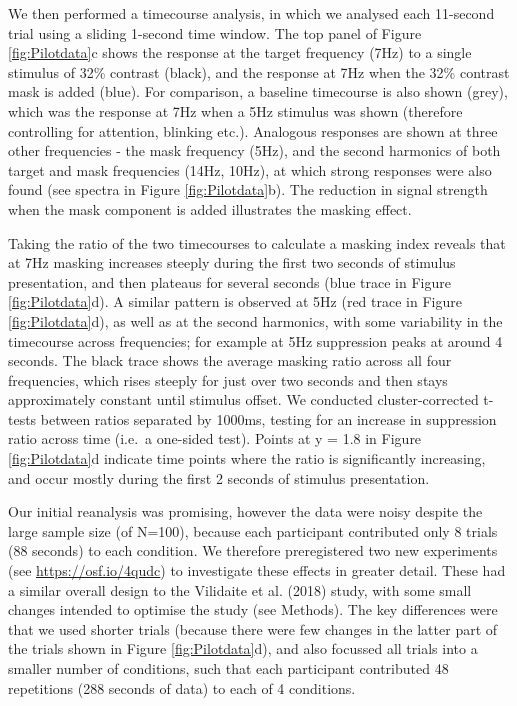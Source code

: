 \documentclass[
]{article}
\begin{document}
We then performed a timecourse analysis, in which we analysed each 11-second trial using a sliding 1-second time window. The top panel of Figure \ref{fig:Pilotdata}c shows the response at the target frequency (7Hz) to a single stimulus of 32\% contrast (black), and the response at 7Hz when the 32\% contrast mask is added (blue). For comparison, a baseline timecourse is also shown (grey), which was the response at 7Hz when a 5Hz stimulus was shown (therefore controlling for attention, blinking etc.). Analogous responses are shown at three other frequencies - the mask frequency (5Hz), and the second harmonics of both target and mask frequencies (14Hz, 10Hz), at which strong responses were also found (see spectra in Figure \ref{fig:Pilotdata}b). The reduction in signal strength when the mask component is added illustrates the masking effect.

Taking the ratio of the two timecourses to calculate a masking index reveals that at 7Hz masking increases steeply during the first two seconds of stimulus presentation, and then plateaus for several seconds (blue trace in Figure \ref{fig:Pilotdata}d). A similar pattern is observed at 5Hz (red trace in Figure \ref{fig:Pilotdata}d), as well as at the second harmonics, with some variability in the timecourse across frequencies; for example at 5Hz suppression peaks at around 4 seconds. The black trace shows the average masking ratio across all four frequencies, which rises steeply for just over two seconds and then stays approximately constant until stimulus offset. We conducted cluster-corrected t-tests between ratios separated by 1000ms, testing for an increase in suppression ratio across time (i.e.~a one-sided test). Points at y = 1.8 in Figure \ref{fig:Pilotdata}d indicate time points where the ratio is significantly increasing, and occur mostly during the first 2 seconds of stimulus presentation.

Our initial reanalysis was promising, however the data were noisy despite the large sample size (of N=100), because each participant contributed only 8 trials (88 seconds) to each condition. We therefore preregistered two new experiments (see \url{https://osf.io/4qudc}) to investigate these effects in greater detail. These had a similar overall design to the Vilidaite et al. (2018) study, with some small changes intended to optimise the study (see Methods). The key differences were that we used shorter trials (because there were few changes in the latter part of the trials shown in Figure \ref{fig:Pilotdata}d), and also focussed all trials into a smaller number of conditions, such that each participant contributed 48 repetitions (288 seconds of data) to each of 4 conditions.
\end{document}

